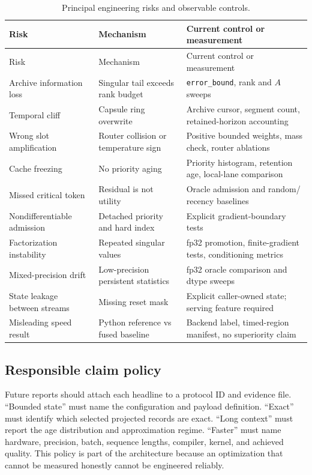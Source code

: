 \begin{longtable}{@{}p{}p{}p{}@{}}
\caption{Principal engineering risks and observable controls.}
\label{tab:risk-register}\\
\toprule
Risk & Mechanism & Current control or measurement \\
\midrule
\endfirsthead
\toprule
Risk & Mechanism & Current control or measurement \\
\midrule
\endhead
Archive information loss & Singular tail exceeds rank budget &
\texttt{error\_bound}, rank and \(A\) sweeps \\
Temporal cliff & Capsule ring overwrite & Archive cursor, segment count,
retained-horizon accounting \\
Wrong slot amplification & Router collision or temperature sign &
Positive bounded weights, mass check, router ablations \\
Cache freezing & No priority aging & Priority histogram, retention age,
local-lane comparison \\
Missed critical token & Residual is not utility & Oracle admission and random/
recency baselines \\
Nondifferentiable admission & Detached priority and hard index & Explicit
gradient-boundary tests \\
Factorization instability & Repeated singular values & fp32 promotion,
finite-gradient tests, conditioning metrics \\
Mixed-precision drift & Low-precision persistent statistics & fp32 oracle
comparison and dtype sweeps \\
State leakage between streams & Missing reset mask & Explicit caller-owned
state; serving feature required \\
Misleading speed result & Python reference vs fused baseline & Backend label,
timed-region manifest, no superiority claim \\
\bottomrule
\end{longtable}

\subsection{Responsible claim policy}

Future reports should attach each headline to a protocol ID and evidence file.
``Bounded state'' must name the configuration and payload definition.
``Exact'' must identify which selected projected records are exact.
``Long context'' must report the age distribution and approximation regime.
``Faster'' must name hardware, precision, batch, sequence lengths, compiler,
kernel, and achieved quality. This policy is part of the architecture because
an optimization that cannot be measured honestly cannot be engineered
reliably.
